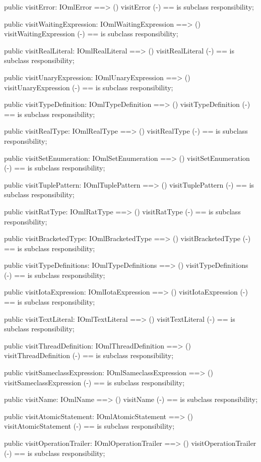 \begin{vdm_al}
  public visitError: IOmlError ==> ()
  visitError (-) == is subclass responsibility;

  public visitWaitingExpression: IOmlWaitingExpression ==> ()
  visitWaitingExpression (-) == is subclass responsibility;

  public visitRealLiteral: IOmlRealLiteral ==> ()
  visitRealLiteral (-) == is subclass responsibility;

  public visitUnaryExpression: IOmlUnaryExpression ==> ()
  visitUnaryExpression (-) == is subclass responsibility;

  public visitTypeDefinition: IOmlTypeDefinition ==> ()
  visitTypeDefinition (-) == is subclass responsibility;

  public visitRealType: IOmlRealType ==> ()
  visitRealType (-) == is subclass responsibility;

  public visitSetEnumeration: IOmlSetEnumeration ==> ()
  visitSetEnumeration (-) == is subclass responsibility;

  public visitTuplePattern: IOmlTuplePattern ==> ()
  visitTuplePattern (-) == is subclass responsibility;

  public visitRatType: IOmlRatType ==> ()
  visitRatType (-) == is subclass responsibility;

  public visitBracketedType: IOmlBracketedType ==> ()
  visitBracketedType (-) == is subclass responsibility;

  public visitTypeDefinitions: IOmlTypeDefinitions ==> ()
  visitTypeDefinitions (-) == is subclass responsibility;

  public visitIotaExpression: IOmlIotaExpression ==> ()
  visitIotaExpression (-) == is subclass responsibility;

  public visitTextLiteral: IOmlTextLiteral ==> ()
  visitTextLiteral (-) == is subclass responsibility;

  public visitThreadDefinition: IOmlThreadDefinition ==> ()
  visitThreadDefinition (-) == is subclass responsibility;

  public visitSameclassExpression: IOmlSameclassExpression ==> ()
  visitSameclassExpression (-) == is subclass responsibility;

  public visitName: IOmlName ==> ()
  visitName (-) == is subclass responsibility;

  public visitAtomicStatement: IOmlAtomicStatement ==> ()
  visitAtomicStatement (-) == is subclass responsibility;

  public visitOperationTrailer: IOmlOperationTrailer ==> ()
  visitOperationTrailer (-) == is subclass responsibility;


\end{vdm_al}
